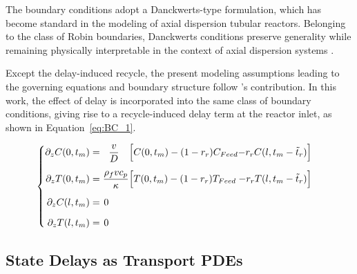 The boundary conditions adopt a Danckwerts-type formulation, which has become standard in the modeling of axial dispersion tubular reactors. Belonging to the class of Robin boundaries, Danckwerts conditions preserve generality while remaining physically interpretable in the context of axial dispersion systems \autocite{Danckwerts1953Continuous}.

Except the delay-induced recycle, the present modeling assumptions leading to the governing equations and boundary structure follow 's contribution\autocite{Khatibi2021Model}. In this work, the effect of delay is incorporated into the same class of boundary conditions, giving rise to a recycle-induced delay term at the reactor inlet, as shown in Equation~\eqref{eq:BC_1}.

\begin{equation} \label{eq:BC_1}
\begin{cases}
    \begin{alignedat}{3}
        \partial_{z} C(0, t_m) &=& \dfrac{v}{D} \quad \Bigl[                           &C(0, t_m) - (1-r_r) C_{Feed} & - r_r C(l, t_m-\tilde{t}_r) \Bigr] & \\[1.4ex]
        \partial_{z} T(0, t_m) &=& \hspace{0.3em} \dfrac{\rho_f v c_p}{\kappa} \Bigl[ &T(0, t_m) - (1-r_r) T_{Feed} & - r_r T(l, t_m-\tilde{t}_r) \Bigr] & \\[1.4ex]
        \partial_{z} C(l, t_m) &=& 0 \hspace{0.9cm}                                    &                           &                                  & \\[1.4ex]
        \partial_{z} T(l, t_m) &=& 0 \hspace{0.9cm}                                    &                           &                                  & \\
    \end{alignedat}
\end{cases}
\end{equation}

\subsection{State Delays as Transport PDEs}

